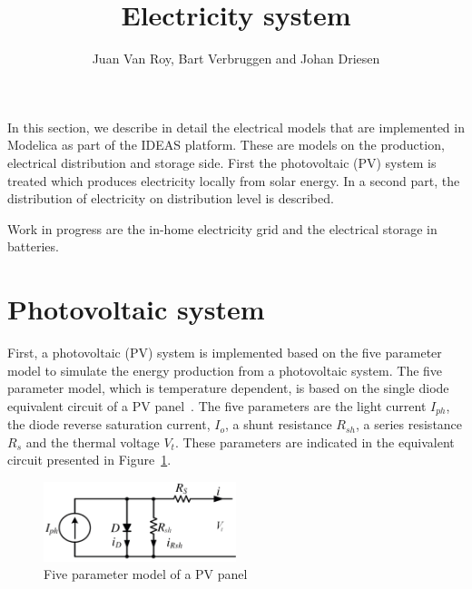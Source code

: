 
\title{Electricity system}
\author{Juan Van Roy, Bart Verbruggen and Johan Driesen}

\maketitle


\vspace{\baselineskip}

In this section, we describe in detail the electrical models that are implemented in Modelica as part of the IDEAS platform. These are models on the production, electrical distribution and storage side. First the photovoltaic (PV) system is treated which produces electricity locally from solar energy. In a second part, the distribution of electricity on distribution level is described.

Work in progress are the in-home electricity grid and the electrical storage in batteries.

\section{Photovoltaic system}
First, a photovoltaic (PV) system is implemented based on the five parameter model to simulate the energy production from a photovoltaic system. The five parameter model, which is temperature dependent, is based on the single diode equivalent circuit of a PV panel~\cite{desoto,sera}. The five parameters are the light current $I_{ph}$, the diode reverse saturation current, $I_{o}$, a shunt resistance $R_{sh}$, a series resistance $R_{s}$ and the thermal voltage $V_{t}$. These parameters are indicated in the equivalent circuit presented in Figure~\ref{fig:5param_equiv}.

\begin{figure}[ht]
\centerline{\includegraphics[width=0.5\textwidth]{Electric/MyGraphics/5param_eq.png}}
\label{fig:5param_equiv}
\caption{Five parameter model of a PV panel~\cite{desoto}} 
\end{figure}

